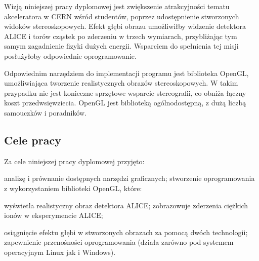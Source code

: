 Wizją niniejszej pracy dyplomowej jest zwiększenie atrakcyjności tematu akceleratora w CERN wśród studentów, poprzez udostępnienie stworzonych widoków stereoskopowych. Efekt głębi obrazu umożliwiłby widzenie detektora ALICE i torów cząstek po zderzeniu w trzech wymiarach, przybliżając tym samym zagadnienie fizyki dużych energii. Wsparciem do spełnienia tej misji posłużyłoby odpowiednie oprogramowanie. 

Odpowiednim narzędziem do implementacji programu jest biblioteka OpenGL, umożliwiająca tworzenie realistycznych obrazów stereoskopowych. W takim przypadku nie jest konieczne sprzętowe wsparcie stereografii, co obniża łączny koszt przedwsięwziecia. OpenGL jest biblioteką ogólnodostępną, z dużą liczbą samouczków i poradników.  

\subsection{Cele pracy}
Za cele niniejszej pracy dyplomowej przyjęto:
\begin{itemize}
\itemi analizę i prównanie dostępnych narzędzi graficznych;
\itemi stworzenie oprogramowania z wykorzystaniem biblioteki OpenGL, które:
	\begin{itemize}
	\itemii wyświetla realistyczny obraz detektora ALICE;
	\itemii zobrazowuje zderzenia ciężkich ionów w eksperymencie ALICE;
	\end{itemize}
\itemi osiągnięcie efektu głębi w stworzonych obrazach za pomocą dwóch technologii;
\itemi zapewnienie przenośności oprogramowania (działa zarówno pod systemem operacyjnym Linux jak i Windows).
\end{itemize}

